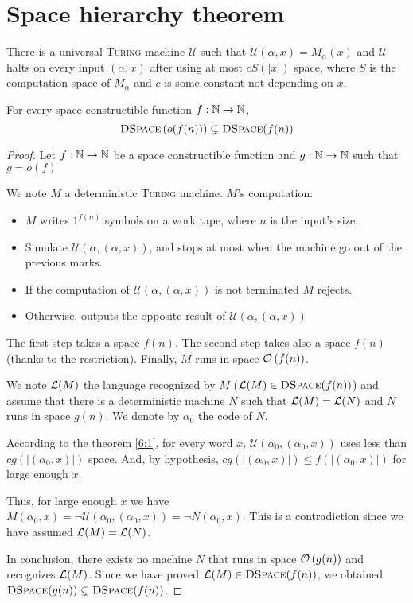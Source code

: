 \section{Space hierarchy theorem}

\begin{thm}\label{6:1}
    There is a universal \textsc{Turing} machine $\mathcal{U}$ such that $\mathcal{U}(\alpha,x) = M_\alpha(x)$ and $\mathcal{U}$ halts on every input $(\alpha,x)$ after using at most $c S(|x|)$ space, where $S$ is the computation space of $M_\alpha$ and $c$ is some constant not depending on $x$.
\end{thm}

\begin{thm}
    For every space-constructible function $f:\mathbb{N} \to \mathbb{N}$,    
    $$
        \textsc{DSpace}\left(o(f(n))\right) \subsetneq \textsc{DSpace}(f(n))
    $$
\end{thm}
\begin{proof}
Let $f:\mathbb{N}\to\mathbb{N}$ be a space constructible function and $g:\mathbb{N}\to\mathbb{N}$ such that $g=o(f)$

We note $M$ a deterministic \textsc{Turing} machine. $M$'s computation:
\begin{itemize}
    \item $M$ writes $1^{f(n)}$ symbols on a work tape, where $n$ is the input's size.
    \item Simulate $\mathcal{U}(\alpha,(\alpha,x))$, and stops at most when the machine go out of the previous marks.
    \item If the computation of $\mathcal{U}(\alpha,(\alpha,x))$ is not terminated $M$ rejects.
    \item Otherwise, outputs the opposite result of $\mathcal{U}(\alpha,(\alpha,x))$
\end{itemize}

    The first step takes a space $f(n)$. The second step takes also a space $f(n)$ (thanks to the restriction). Finally, $M$ runs in space $\mathcal O \left( f(n) \right)$.

    We note $\mathcal{L}(M)$ the language recognized by $M$ ($\mathcal{L}(M)\in\textsc{DSpace}(f(n))$) and assume that there is a deterministic machine $N$ such that $\mathcal{L}(M)= \mathcal{L}(N)$ and $N$ runs in space $g(n)$. We denote by $\alpha_0$ the code of $N$.

    According to the theorem \ref{6:1}, for every word $x$, $\mathcal{U}(\alpha_0,(\alpha_0,x))$ uses less than $c g(|(\alpha_0,x)|)$ space. And, by hypothesis, $c g(|(\alpha_0,x)|) \leqslant f(|(\alpha_0,x)|)$ for large enough $x$.

    Thus, for large enough $x$ we have $M(\alpha_0,x) = \neg\mathcal{U}(\alpha_0,(\alpha_0,x)) = \neg N(\alpha_0,x)$. This is a contradiction since we have assumed $\mathcal{L}(M)= \mathcal{L}(N)$.
  
  In conclusion, there exists no machine $N$ that runs in space $\mathcal O \left( g(n) \right)$ and recognizes $\mathcal{L}(M)$. Since we have proved $\mathcal{L}(M) \in \textsc{DSpace}(f(n))$, we obtained $\textsc{DSpace} (g(n)) \subsetneq \textsc{DSpace}(f(n))$.
\end{proof}


